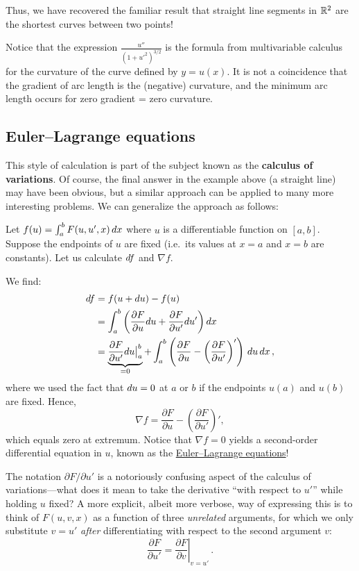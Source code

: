 Thus, we have recovered the familiar result  that straight line segments in $\mathbb R^2$ are the shortest curves between two points!

\begin{remark}
    Notice that the expression $\frac{u''}{(1+ u'^2)^{3/2}}$ is the formula from multivariable calculus for the curvature of the curve defined by $y= u(x)$. It is not a coincidence that the gradient of arc length is the (negative) curvature, and the minimum arc length occurs for zero gradient = zero curvature.
\end{remark}



\subsection{Euler--Lagrange equations}

This style of calculation is part of the subject known as the \textbf{calculus of variations}.  Of course, the final answer in the example above (a straight line) may have been obvious, but a similar approach can be applied to many more interesting problems.  We can generalize the approach as follows:
\begin{example}
    Let $f(u) = \int_a^b F(u, u', x) \, d x$ where $u$ is a differentiable function on $[a,b]$. Suppose the endpoints of $u$ are fixed (i.e.~its values at $x=a$ and $x=b$ are constants). Let us calculate $d f$ and $\nabla f$.
\end{example}

We find:
\begin{align*}
    d f &= f(u + d u) - f(u) \\
    &= \int_a^b \left(\frac{\partial F}{\partial u} d u  + \frac{\partial F}{\partial u'} d u' \right) d x \\
    &= \underbrace{\frac{\partial F}{\partial u'} d u \bigr|_a^b}_{= 0} + \int_a^b \left( \frac{\partial F}{\partial u} - \left(\frac{\partial F}{\partial u'}\right)'\right) \, d u \, d x \, ,
\end{align*}
where we used the fact that $d u = 0$ at $a$ or $b$ if the endpoints $u(a)$ and $u(b)$ are fixed. 
Hence, 
\[
\nabla f = \frac{\partial F}{\partial u} - \left(\frac{\partial F}{\partial u'}\right)',
\]
which equals zero at extremum. Notice that $\nabla f = 0$ yields a second-order differential equation in $u$, known as the \href{https://en.wikipedia.org/wiki/Euler%E2%80%93Lagrange_equation}{Euler--Lagrange equations}! 

\begin{remark}
The notation $\partial F / \partial u'$ is a notoriously confusing aspect of the calculus of variations---what does it mean to take the derivative ``with respect to $u'$'' while holding $u$ fixed?   A more explicit, albeit more verbose, way of expressing this is to think of $F(u,v,x)$ as a function of three \emph{unrelated} arguments, for which we only substitute $v=u'$ \emph{after} differentiating with respect to the second argument $v$:
$$
\frac{\partial F}{\partial u'} = \left. \frac{\partial F}{\partial v} \right|_{v=u'} \, .
$$
\end{remark}

